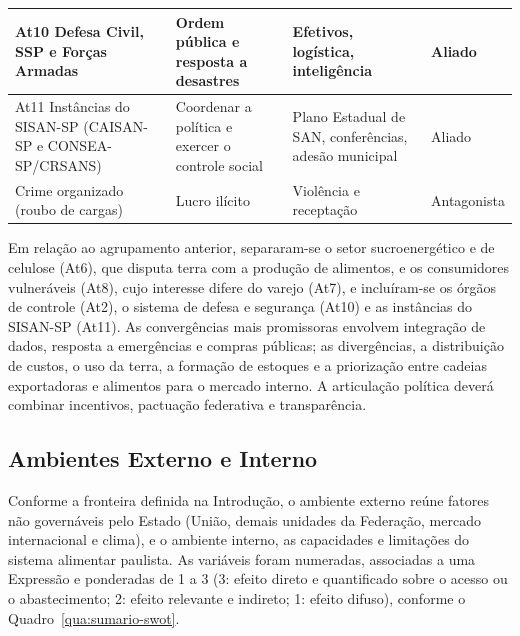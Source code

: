 \documentclass[
	12pt,				%
	openright,			%
	oneside,			%
	a4paper,			%
	chapter=TITLE,		%
	section=TITLE,		%
	english,			%
	french,				%
	spanish,			%
	brazil,				%
 ]{abntex2}
\begin{document}
\begin{quadro}[!htbp]
\begin{tabularx}{\textwidth}{|>{\raggedright\arraybackslash}p{3.3cm}|>{\raggedright\arraybackslash}X|>{\raggedright\arraybackslash}p{3.3cm}|>{\centering\arraybackslash}p{1.75cm}|}
\hline
At10 Defesa Civil, SSP e Forças Armadas & Ordem pública e resposta a desastres & Efetivos, logística, inteligência & Aliado \\
\hline
At11 Instâncias do SISAN-SP (CAISAN-SP e CONSEA-SP/CRSANS) & Coordenar a política e exercer o controle social & Plano Estadual de SAN, conferências, adesão municipal & Aliado \\
\hline
Crime organizado (roubo de cargas) & Lucro ilícito & Violência e receptação & Antagonista \\
\hline
\end{tabularx}
\end{quadro}

Em relação ao agrupamento anterior, separaram-se o setor sucroenergético e de
celulose (At6), que disputa terra com a produção de alimentos, e os
consumidores vulneráveis (At8), cujo interesse difere do varejo (At7), e
incluíram-se os órgãos de controle (At2), o sistema de defesa e segurança
(At10) e as instâncias do SISAN-SP (At11). As convergências mais promissoras envolvem integração de dados,
resposta a emergências e compras públicas; as divergências, a distribuição de
custos, o uso da terra, a formação de estoques e a priorização entre cadeias
exportadoras e alimentos para o mercado interno. A articulação política deverá
combinar incentivos, pactuação federativa e transparência.

\subsection{Ambientes Externo e Interno}
Conforme a fronteira definida na Introdução, o ambiente externo reúne fatores
não governáveis pelo Estado (União, demais unidades da Federação, mercado
internacional e clima), e o ambiente interno, as capacidades e limitações do
sistema alimentar paulista. As variáveis
foram numeradas, associadas a uma Expressão e ponderadas de 1 a 3 (3: efeito
direto e quantificado sobre o acesso ou o abastecimento; 2: efeito relevante e
indireto; 1: efeito difuso), conforme o Quadro~\ref{qua:sumario-swot}.
\end{document}
